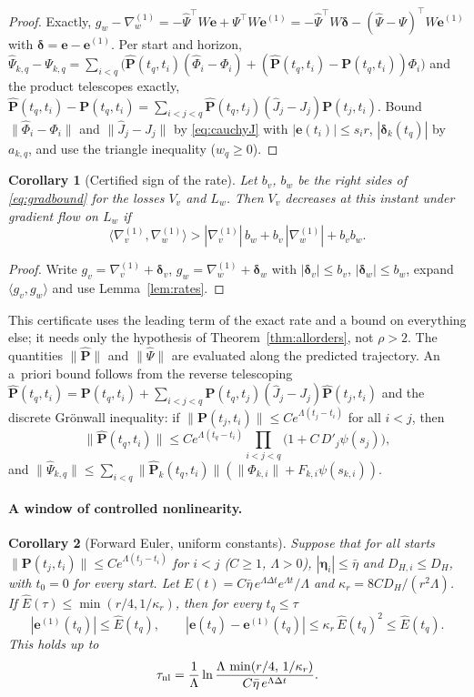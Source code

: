 \documentclass[11pt]{article}
\newtheorem{corollary}{Corollary}
\theoremstyle{definition}
\theoremstyle{remark}
\newcommand{\ee}{\mathbf{e}}
\newcommand{\dt}{\Delta t}
\newcommand{\Pp}{\mathbf P}
\newcommand{\Ph}{\hat{\mathbf P}}
\newcommand{\Phih}{\hat\Phi}
\newcommand{\Psih}{\hat\Psi}
\newcommand{\etab}{\bm{\eta}}
\begin{document}
\begin{proof}
Exactly, $g_w-\nabla^{(1)}_w=-\Psih^\top W\ee+\Psi^\top W\ee^{(1)}=-\Psih^\top W\bm\delta-(\Psih-\Psi)^\top W\ee^{(1)}$ with $\bm\delta=\ee-\ee^{(1)}$.
Per start and horizon, $\Psih_{k,q}-\Psi_{k,q}=\sum_{i<q}\big(\Ph(t_q,t_i)(\Phih_i-\Phi_i)+(\Ph(t_q,t_i)-\Pp(t_q,t_i))\Phi_i\big)$ and the product telescopes exactly, $\Ph(t_q,t_i)-\Pp(t_q,t_i)=\sum_{i<j<q}\Ph(t_q,t_j)(\hat J_j-J_j)\Pp(t_j,t_i)$.
Bound $\|\Phih_i-\Phi_i\|$ and $\|\hat J_j-J_j\|$ by \eqref{eq:cauchyJ} with $|\ee(t_i)|\le s_ir$, $|\bm\delta_k(t_q)|$ by $a_{k,q}$, and use the triangle inequality ($w_q\ge0$).
\end{proof}

\begin{corollary}[Certified sign of the rate]\label{cor:sign}
Let $b_v$, $b_w$ be the right sides of \eqref{eq:gradbound} for the losses $V_v$ and $L_w$. Then $V_v$ decreases at this instant under gradient flow on $L_w$ if
\[
\langle\nabla^{(1)}_v,\nabla^{(1)}_w\rangle>|\nabla^{(1)}_v|\,b_w+b_v\,|\nabla^{(1)}_w|+b_vb_w .
\]
\end{corollary}

\begin{proof}
Write $g_v=\nabla^{(1)}_v+\bm\delta_v$, $g_w=\nabla^{(1)}_w+\bm\delta_w$ with $|\bm\delta_v|\le b_v$, $|\bm\delta_w|\le b_w$, expand $\langle g_v,g_w\rangle$ and use Lemma~\ref{lem:rates}.
\end{proof}

This certificate uses the leading term of the exact rate and a bound on everything else; it needs only the hypothesis of Theorem~\ref{thm:allorders}, not $\rho>2$.
The quantities $\|\Ph\|$ and $\|\Psih\|$ are evaluated along the predicted trajectory.
An a~priori bound follows from the reverse telescoping $\Ph(t_q,t_i)=\Pp(t_q,t_i)+\sum_{i<j<q}\Pp(t_q,t_j)(\hat J_j-J_j)\Ph(t_j,t_i)$ and the discrete Grönwall inequality: if $\|\Pp(t_j,t_i)\|\le Ce^{\Lambda(t_j-t_i)}$ for all $i<j$, then
\begin{equation}\label{eq:gronwall}
\|\Ph(t_q,t_i)\|\le Ce^{\Lambda(t_q-t_i)}\prod_{i<j<q}\big(1+C\,D'_j\psi(s_j)\big),
\end{equation}
and $\|\Psih_{k,q}\|\le\sum_{i<q}\|\Ph_k(t_q,t_i)\|(\|\Phi_{k,i}\|+F_{k,i}\psi(s_{k,i}))$.

\paragraph{A window of controlled nonlinearity.}
\begin{corollary}[Forward Euler, uniform constants]\label{cor:closed}
Suppose that for all starts $\|\Pp(t_j,t_i)\|\le C e^{\Lambda(t_j-t_i)}$ for $i<j$ ($C\ge1$, $\Lambda>0$), $|\etab_i|\le\bar\eta$ and $D_{H,i}\le D_H$, with $t_0=0$ for every start.
Let $\hat E(t)=C\bar\eta\,e^{\Lambda\dt}e^{\Lambda t}/\Lambda$ and $\kappa_r=8CD_H/(r^2\Lambda)$.
If $\hat E(\tau)\le\min(r/4,1/\kappa_r)$, then for every $t_q\le\tau$
\[
|\ee^{(1)}(t_q)|\le\hat E(t_q),\qquad |\ee(t_q)-\ee^{(1)}(t_q)|\le\kappa_r\,\hat E(t_q)^2\le\hat E(t_q).
\]
This holds up to
\[
\tau_{\rm nl}=\frac1\Lambda\ln\frac{\Lambda\,\min(r/4,\,1/\kappa_r)}{C\bar\eta\,e^{\Lambda\dt}} .
\]
\end{corollary}
\end{document}
